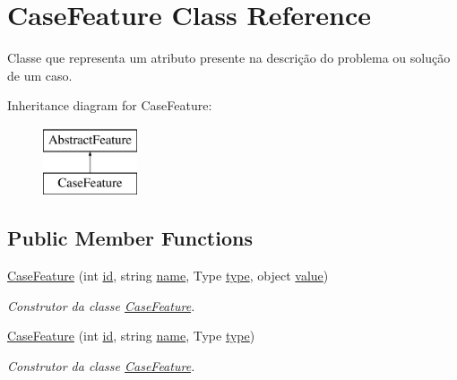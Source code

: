 \hypertarget{class_case_feature}{}\section{Case\+Feature Class Reference}
\label{class_case_feature}


Classe que representa um atributo presente na descrição do problema ou solução de um caso.  


Inheritance diagram for Case\+Feature\+:\begin{figure}[H]
\begin{center}
\leavevmode
\includegraphics[height=2.000000cm]{class_case_feature}
\end{center}
\end{figure}
\subsection*{Public Member Functions}
\begin{DoxyCompactItemize}
\item 
\hyperlink{class_case_feature_a9443dc93f40c63cc812c4102f15498c5}{Case\+Feature} (int \hyperlink{class_abstract_feature_a3ac6f31b3e7a83ce4f73fab9f0139b7f}{id}, string \hyperlink{class_abstract_feature_a48465ede21b778021ea03b56d2117bc8}{name}, Type \hyperlink{class_abstract_feature_ac65cf0de277a8a62b6b1e1bdc249b237}{type}, object \hyperlink{class_case_feature_a1aa9c93657c27e6a8debdf71a40f5b89}{value})
\begin{DoxyCompactList}\small\item\em Construtor da classe \hyperlink{class_case_feature}{Case\+Feature}. \end{DoxyCompactList}\item 
\hyperlink{class_case_feature_afcbe5b640972620a71192f3b45c8cbcc}{Case\+Feature} (int \hyperlink{class_abstract_feature_a3ac6f31b3e7a83ce4f73fab9f0139b7f}{id}, string \hyperlink{class_abstract_feature_a48465ede21b778021ea03b56d2117bc8}{name}, Type \hyperlink{class_abstract_feature_ac65cf0de277a8a62b6b1e1bdc249b237}{type})
\begin{DoxyCompactList}\small\item\em Construtor da classe \hyperlink{class_case_feature}{Case\+Feature}. \end{DoxyCompactList}\end{DoxyCompactItemize}

